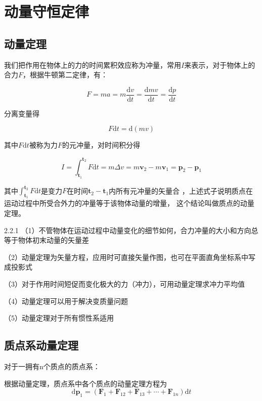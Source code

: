 
\section{动量守恒定律}
\subsection{动量定理}
\begin{definition}[冲量]
    我们把作用在物体上的力的时间累积效应称为冲量，常用$I$来表示，对于物体上的合力$F$，根据牛顿第二定律，有：

    \[
        F = ma = m\dfrac{\mathrm{d}v}{\mathrm{d}t}= \dfrac{\mathrm{d}mv}{\mathrm{d}t} = \dfrac{\mathrm{d}p}{\mathrm{d}t}
    \]

    分离变量得
    
    \[
       F\mathrm{d}t=\mathrm{d}(mv)
    \]

    其中$F\mathrm{d}t$被称为力$F$的元冲量，对时间积分得

    \[
        I=\int_{\boldsymbol{t}_1}^{\boldsymbol{t}_2}F\mathrm{d}t=m\Delta v=m\boldsymbol{v}_2-m\boldsymbol{v}_1=\boldsymbol{p}_2-\boldsymbol{p}_1
    \]

    其中$\int_{\boldsymbol{t}_1}^{\boldsymbol{t}_2}F\mathrm{d}t$是变力$F$在时间$\boldsymbol{t}_2-\boldsymbol{t}_1$内所有元冲量的矢量合
    ，上述式子说明质点在运动过程中所受合外力的冲量等于该物体动量的增量，
    这个结论叫做质点的动量定理。

   

\end{definition}
\label{def:theorem of momentum}
\begin{attention}{ }{2.2.1}
    （1）不管物体在运动过程中动量变化的细节如何，合力冲量的大小和方向总等于物体初末动量的矢量差

    （2）动量定理为矢量方程，应用时可直接矢量作图，也可在平面直角坐标系中写成投影式

    （3）对于作用时间短促而变化极大的力（冲力），可用动量定理求冲力平均值

    （4）动量定理可以用于解决变质量问题

    （5）动量定理对于所有惯性系适用

\end{attention}


\subsection{质点系动量定理}
对于一拥有n个质点的质点系：

根据动量定理，质点系中各个质点的动量定理方程为
$$\mathrm{d}\boldsymbol{p}_{1}=(\boldsymbol{F}_{1}+\boldsymbol{F}_{12}+\boldsymbol{F}_{13}+\cdots+\boldsymbol{F}_{1n})\mathrm{d}t$$


